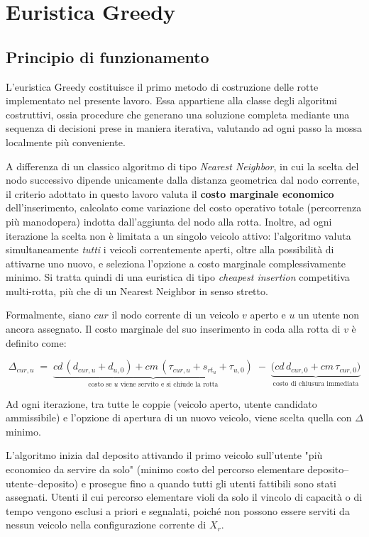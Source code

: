 \section{Euristica Greedy}

\subsection{Principio di funzionamento}

L'euristica Greedy costituisce il primo metodo di costruzione delle rotte implementato nel presente lavoro. Essa appartiene alla classe degli algoritmi costruttivi, ossia procedure che generano una soluzione completa mediante una sequenza di decisioni prese in maniera iterativa, valutando ad ogni passo la mossa localmente più conveniente.

A differenza di un classico algoritmo di tipo \emph{Nearest Neighbor}, in cui la scelta del nodo successivo dipende unicamente dalla distanza geometrica dal nodo corrente, il criterio adottato in questo lavoro valuta il \textbf{costo marginale economico} dell'inserimento, calcolato come variazione del costo operativo totale (percorrenza più manodopera) indotta dall'aggiunta del nodo alla rotta. Inoltre, ad ogni iterazione la scelta non è limitata a un singolo veicolo attivo: l'algoritmo valuta simultaneamente \emph{tutti} i veicoli correntemente aperti, oltre alla possibilità di attivarne uno nuovo, e seleziona l'opzione a costo marginale complessivamente minimo. Si tratta quindi di una euristica di tipo \emph{cheapest insertion} competitiva multi-rotta, più che di un Nearest Neighbor in senso stretto.

Formalmente, siano $cur$ il nodo corrente di un veicolo $v$ aperto e $u$ un utente non ancora assegnato. Il costo marginale del suo inserimento in coda alla rotta di $v$ è definito come:

\[
\Delta_{cur,u} \;=\; \underbrace{cd\,(d_{cur,u}+d_{u,0}) + cm\,(\tau_{cur,u}+s_{r t_u}+\tau_{u,0})}_{\text{costo se } u \text{ viene servito e si chiude la rotta}} \;-\; \underbrace{\big(cd\,d_{cur,0}+cm\,\tau_{cur,0}\big)}_{\text{costo di chiusura immediata}}
\]

Ad ogni iterazione, tra tutte le coppie (veicolo aperto, utente candidato ammissibile) e l'opzione di apertura di un nuovo veicolo, viene scelta quella con $\Delta$ minimo.

L'algoritmo inizia dal deposito attivando il primo veicolo sull'utente "più economico da servire da solo" (minimo costo del percorso elementare deposito--utente--deposito) e prosegue fino a quando tutti gli utenti fattibili sono stati assegnati. Utenti il cui percorso elementare violi da solo il vincolo di capacità o di tempo vengono esclusi a priori e segnalati, poiché non possono essere serviti da nessun veicolo nella configurazione corrente di $X_r$.

